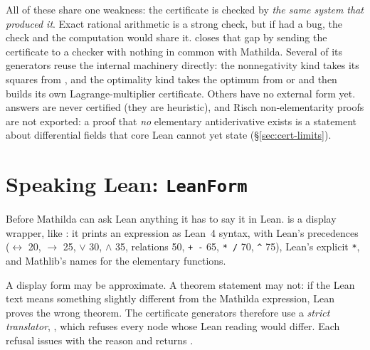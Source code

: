 All of these share one weakness: the certificate is checked by \emph{the same system
that produced it}. Exact rational arithmetic is a strong check, but if
 had a bug, the check and the computation would share it. 
closes that gap by sending the certificate to a checker with nothing in common with
Mathilda. Several of its generators reuse the internal machinery directly: the
nonnegativity kind takes its squares from , and the optimality kind takes the optimum from  or
 and then builds its own Lagrange-multiplier certificate. Others have no
external form yet.  answers are never certified (they are
heuristic), and Risch non-elementarity proofs are not exported: a proof that
\emph{no} elementary antiderivative exists is a statement about differential fields
that core Lean cannot yet state (\S\ref{sec:cert-limits}).

\section{Speaking Lean: \texttt{LeanForm}}
\label{sec:cert-leanform}

Before Mathilda can ask Lean anything it has to say it in Lean.  is
a display wrapper, like : it prints an expression as Lean~4
syntax, with Lean's precedences (\(\leftrightarrow\) 20, \(\to\) 25, \(\lor\) 30,
\(\land\) 35, relations 50, \texttt{+ -} 65, \texttt{* /} 70, \texttt{\^{}} 75),
Lean's explicit \texttt{*}, and Mathlib's names for the elementary functions.

\begin{codepairs}
\end{codepairs}

A display form may be approximate. A theorem statement may not: if the Lean text
means something slightly different from the Mathilda expression, Lean proves the wrong
theorem. The certificate generators therefore use a \emph{strict
translator},
, which refuses every node whose Lean reading would differ. Each
refusal issues  with the reason and returns
.


